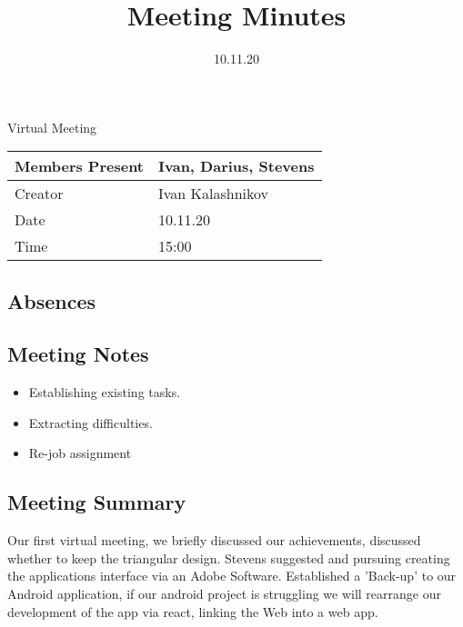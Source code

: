 \documentclass{article}
\title{Meeting Minutes}
\date{10.11.20}
\begin{document}
\maketitle

Virtual Meeting

\begin{center}
    \begin{tabular}{ | l | p{14cm} |}
    \hline
    Members Present & Ivan, Darius, Stevens \\ \hline
    Creator         & Ivan Kalashnikov \\ \hline
    Date            & 10.11.20 \\ \hline
    Time            & 15:00 \\ \hline
    \end{tabular}
\end{center}

\subsection{Absences}

\subsection{Meeting Notes}
\begin{itemize}
    \item Establishing existing tasks.
    \item Extracting difficulties.
    \item Re-job assignment
\end{itemize}

\subsection{Meeting Summary}

Our first virtual meeting, we briefly discussed our achievements, discussed whether to keep the triangular design. Stevens suggested and pursuing creating the applications interface via an Adobe Software.
Established a 'Back-up' to our Android application, if our android project is struggling we will rearrange our development of the app via react, linking the Web into a web app.
\end{document}
